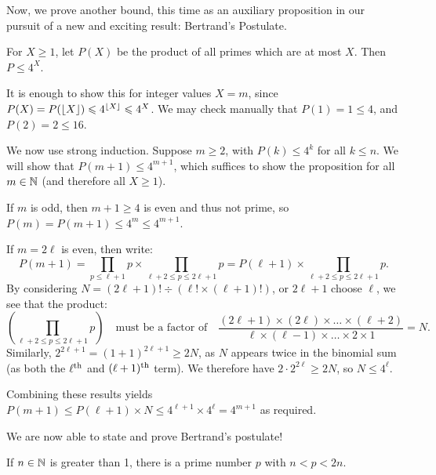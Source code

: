 \documentclass{article}
\begin{document}
Now, we prove another bound, this time as an auxiliary proposition in our pursuit of a new and exciting result: Bertrand's Postulate.

\begin{proposition}
	\label{prime-product-4x}
    For $X \geq 1$, let $P(X)$ be the product of all primes which are at most $X$. Then $P \leq 4^X$.
\end{proposition}

\begin{prf}
    It is enough to show this for integer values $X = m$, since $P(X) = P(\left\lfloor X\right\rfloor) \leqslant 4^{\left\lfloor X\right\rfloor} \leqslant 4^X$. We may check manually that $P(1) = 1 \leq 4$, and $P(2) = 2 \leq 16$.
    
    We now use strong induction. Suppose $m \geq 2$, with $P(k) \leq 4^k$ for all $k \leq n$. We will show that $P(m+1) \leq 4^{m+1}$, which suffices to show the proposition for all $m \in \mathbb{N}$ (and therefore all $X \geq 1$).
    
    If $m$ is odd, then $m + 1 \geq 4$ is even and thus not prime, so $P(m) = P(m+1) \leq 4^m \leq 4^{m+1}$.
    
    If $m = 2\ell$ is even, then write:
    \[
	P(m+1) = \prod_{p \leq \ell+1} p \times \prod_{\ell + 2 \leq p \leq 2\ell + 1} p
	= P(\ell + 1) \times \prod_{\ell + 2 \leq p \leq 2\ell + 1} p.
	\]
	By considering $N = (2\ell+1)! \div (\ell! \times (\ell+1)!)$, or $2\ell + 1$ choose $\ell$, we see that the product:
	\[
	\left( \prod_{\ell + 2 \leq p \leq 2\ell + 1} p \right)
	\quad \text{must be a factor of} \quad
	\frac{(2\ell+1)\times (2\ell) \times \dots \times (\ell + 2)}{\ell \times (\ell-1) \times \dots \times 2 \times 1} = N.
	\]
	Similarly, $2^{2\ell+1} = (1+1)^{2\ell+1} \geq 2N$, as $N$ appears twice in the binomial sum (as both the $\ell^{\text{th}}$ and $(\ell+1)^{\text{th}}$ term). We therefore have $2 \cdot 2^{2\ell} \geq 2N$, so $N \leq 4^\ell$.
	
	Combining these results yields $P(m+1) \leq P(\ell+1) \times N \leq 4^{\ell+1} \times 4^\ell = 4^{m+1}$ as required.
\end{prf}

We are now able to state and prove Bertrand's postulate!

\begin{theorem}
    If $n \in \mathbb{N}$ is greater than 1, there is a prime number $p$ with $n < p < 2n$.
\end{theorem}
\end{document}

